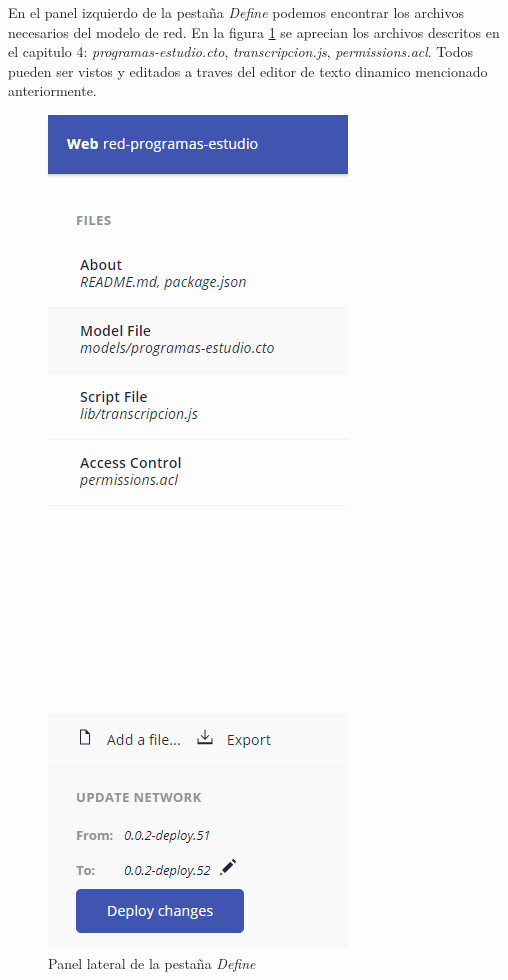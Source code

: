En el panel izquierdo de la pestaña \textit{Define} podemos encontrar los archivos  necesarios del modelo de red. En la figura \ref{fig: playground-define-sidebar} se aprecian los archivos descritos en el capitulo 4: \textit{programas-estudio.cto}, \textit{transcripcion.js}, \textit{permissions.acl}. Todos pueden ser vistos y editados a traves del editor de texto dinamico mencionado anteriormente.
\begin{figure}[H]
\centering
\includegraphics[height=0.6\textheight]{playground8.png}
\caption[Define Sidebar Playground]{Panel lateral de la pestaña \textit{Define}}
\label{fig: playground-define-sidebar}
\end{figure}

